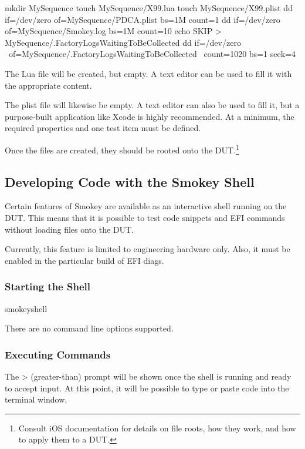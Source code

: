 \documentclass[11pt]{article}
\begin{document}
\begin{CommandLine}
mkdir MySequence
touch MySequence/X99.lua
touch MySequence/X99.plist
dd if=/dev/zero of=MySequence/PDCA.plist bs=1M count=1
dd if=/dev/zero of=MySequence/Smokey.log bs=1M count=10
echo SKIP > MySequence/.FactoryLogsWaitingToBeCollected
dd if=/dev/zero \
	of=MySequence/.FactoryLogsWaitingToBeCollected \
	count=1020 bs=1 seek=4
\end{CommandLine}

The Lua file will be created, but empty.  A text editor can be used to fill it
with the appropriate content.

The plist file will likewise be empty.  A text editor can also be used to fill
it, but a purpose-built application like Xcode is highly recommended.  At a
minimum, the required properties and one test item must be defined.

\CenterImage{Plist.png}

Once the files are created, they should be rooted onto the
DUT.\footnote{Consult iOS documentation for details on file roots, how they
work, and how to apply them to a DUT.}

\subsection{Developing Code with the Smokey Shell}

Certain features of Smokey are available as an interactive shell running on the
DUT.  This means that it is possible to test code snippets and EFI commands
without loading files onto the DUT.

Currently, this feature is limited to engineering hardware only.  Also, it must
be enabled in the particular build of EFI diags.

\subsubsection{Starting the Shell}

\begin{CommandLine}
smokeyshell
\end{CommandLine}

There are no command line options supported.

\subsubsection{Executing Commands}

The > (greater-than) prompt will be shown once the shell is running and ready
to accept input.  At this point, it will be possible to type or paste code into
the terminal window.
\end{document}
